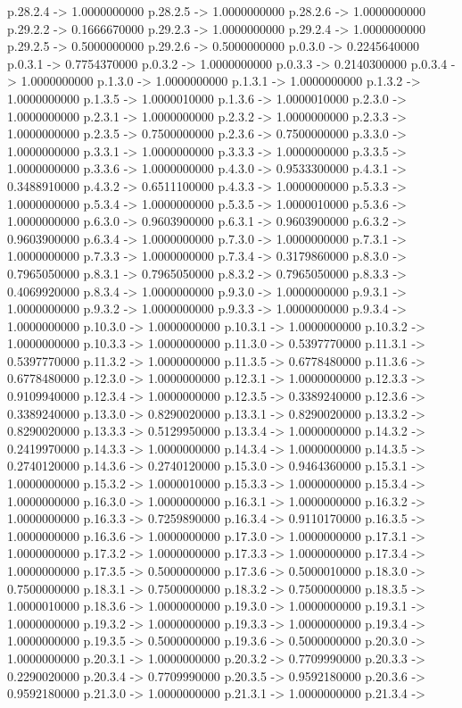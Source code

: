  p.28.2.4 -> 1.0000000000    p.28.2.5 -> 1.0000000000    p.28.2.6 -> 1.0000000000    p.29.2.2 -> 0.1666670000    p.29.2.3 -> 1.0000000000    p.29.2.4 -> 1.0000000000    p.29.2.5 -> 0.5000000000    p.29.2.6 -> 0.5000000000    p.0.3.0 -> 0.2245640000    p.0.3.1 -> 0.7754370000    p.0.3.2 -> 1.0000000000    p.0.3.3 -> 0.2140300000    p.0.3.4 -> 1.0000000000    p.1.3.0 -> 1.0000000000    p.1.3.1 -> 1.0000000000    p.1.3.2 -> 1.0000000000    p.1.3.5 -> 1.0000010000    p.1.3.6 -> 1.0000010000    p.2.3.0 -> 1.0000000000    p.2.3.1 -> 1.0000000000    p.2.3.2 -> 1.0000000000    p.2.3.3 -> 1.0000000000    p.2.3.5 -> 0.7500000000    p.2.3.6 -> 0.7500000000    p.3.3.0 -> 1.0000000000    p.3.3.1 -> 1.0000000000    p.3.3.3 -> 1.0000000000    p.3.3.5 -> 1.0000000000    p.3.3.6 -> 1.0000000000    p.4.3.0 -> 0.9533300000    p.4.3.1 -> 0.3488910000    p.4.3.2 -> 0.6511100000    p.4.3.3 -> 1.0000000000    p.5.3.3 -> 1.0000000000    p.5.3.4 -> 1.0000000000    p.5.3.5 -> 1.0000010000    p.5.3.6 -> 1.0000000000    p.6.3.0 -> 0.9603900000    p.6.3.1 -> 0.9603900000    p.6.3.2 -> 0.9603900000    p.6.3.4 -> 1.0000000000    p.7.3.0 -> 1.0000000000    p.7.3.1 -> 1.0000000000    p.7.3.3 -> 1.0000000000    p.7.3.4 -> 0.3179860000    p.8.3.0 -> 0.7965050000    p.8.3.1 -> 0.7965050000    p.8.3.2 -> 0.7965050000    p.8.3.3 -> 0.4069920000    p.8.3.4 -> 1.0000000000    p.9.3.0 -> 1.0000000000    p.9.3.1 -> 1.0000000000    p.9.3.2 -> 1.0000000000    p.9.3.3 -> 1.0000000000    p.9.3.4 -> 1.0000000000    p.10.3.0 -> 1.0000000000    p.10.3.1 -> 1.0000000000    p.10.3.2 -> 1.0000000000    p.10.3.3 -> 1.0000000000    p.11.3.0 -> 0.5397770000    p.11.3.1 -> 0.5397770000    p.11.3.2 -> 1.0000000000    p.11.3.5 -> 0.6778480000    p.11.3.6 -> 0.6778480000    p.12.3.0 -> 1.0000000000    p.12.3.1 -> 1.0000000000    p.12.3.3 -> 0.9109940000    p.12.3.4 -> 1.0000000000    p.12.3.5 -> 0.3389240000    p.12.3.6 -> 0.3389240000    p.13.3.0 -> 0.8290020000    p.13.3.1 -> 0.8290020000    p.13.3.2 -> 0.8290020000    p.13.3.3 -> 0.5129950000    p.13.3.4 -> 1.0000000000    p.14.3.2 -> 0.2419970000    p.14.3.3 -> 1.0000000000    p.14.3.4 -> 1.0000000000    p.14.3.5 -> 0.2740120000    p.14.3.6 -> 0.2740120000    p.15.3.0 -> 0.9464360000    p.15.3.1 -> 1.0000000000    p.15.3.2 -> 1.0000010000    p.15.3.3 -> 1.0000000000    p.15.3.4 -> 1.0000000000    p.16.3.0 -> 1.0000000000    p.16.3.1 -> 1.0000000000    p.16.3.2 -> 1.0000000000    p.16.3.3 -> 0.7259890000    p.16.3.4 -> 0.9110170000    p.16.3.5 -> 1.0000000000    p.16.3.6 -> 1.0000000000    p.17.3.0 -> 1.0000000000    p.17.3.1 -> 1.0000000000    p.17.3.2 -> 1.0000000000    p.17.3.3 -> 1.0000000000    p.17.3.4 -> 1.0000000000    p.17.3.5 -> 0.5000000000    p.17.3.6 -> 0.5000010000    p.18.3.0 -> 0.7500000000    p.18.3.1 -> 0.7500000000    p.18.3.2 -> 0.7500000000    p.18.3.5 -> 1.0000010000    p.18.3.6 -> 1.0000000000    p.19.3.0 -> 1.0000000000    p.19.3.1 -> 1.0000000000    p.19.3.2 -> 1.0000000000    p.19.3.3 -> 1.0000000000    p.19.3.4 -> 1.0000000000    p.19.3.5 -> 0.5000000000    p.19.3.6 -> 0.5000000000    p.20.3.0 -> 1.0000000000    p.20.3.1 -> 1.0000000000    p.20.3.2 -> 0.7709990000    p.20.3.3 -> 0.2290020000    p.20.3.4 -> 0.7709990000    p.20.3.5 -> 0.9592180000    p.20.3.6 -> 0.9592180000    p.21.3.0 -> 1.0000000000    p.21.3.1 -> 1.0000000000    p.21.3.4 -> 